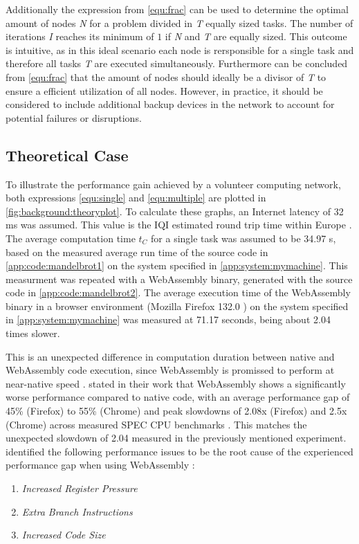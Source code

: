 Additionally the expression from \eqref{equ:frac} can be used to determine the optimal amount of nodes \emph{N} for a problem divided in \emph{T} equally sized tasks. The number of iterations \emph{I} reaches its minimum of $1$ if \emph{N} and \emph{T} are equally sized. This outcome is intuitive, as in this ideal scenario each node is rersponsible for a single task and therefore all tasks \emph{T} are executed simultaneously. Furthermore can be concluded from \eqref{equ:frac} that the amount of nodes should ideally be a divisor of \emph{T} to ensure a efficient utilization of all nodes. However, in practice, it should be considered to include additional backup devices in the network to account for potential failures or disruptions.

\subsection{Theoretical Case}
To illustrate the performance gain achieved by a volunteer computing network, both expressions \eqref{equ:single} and \eqref{equ:multiple} are plotted in \autoref{fig:background:theoryplot}. To calculate these graphs, an Internet latency of 32 ms \cite{backend:latency} was assumed. This value is the \ac{IQI} estimated round trip time within Europe \cite{backend:latency}. The average computation time $t_{C}$ for a single task was assumed to be 34.97 s, based on the measured average run time of the source code in \autoref{app:code:mandelbrot1} on the system specified in \autoref{app:system:mymachine}. This measurment was repeated with a WebAssembly binary, generated with the source code in \autoref{app:code:mandelbrot2}. The average execution time of the WebAssembly binary in a browser environment (Mozilla Firefox 132.0 \cite{background:firefox}) on the system specified in \autoref{app:system:mymachine} was measured at 71.17 seconds, being about 2.04 times slower. 
\newline
\begin{addmargin}[25pt]{25pt}
  This is an unexpected difference in computation duration between native and WebAssembly code execution, since WebAssembly is promissed to perform at near-native speed \cite{methodology:wasm, methodology:wasmW3C}. \citeauthor{background:not-so-fast} stated in their work that WebAssembly shows a significantly worse performance compared to native code, with an average performance gap of 45\% (Firefox) to 55\% (Chrome) and peak slowdowns of 2.08x (Firefox) and 2.5x (Chrome) across measured SPEC CPU benchmarks \cite{background:not-so-fast}. This matches the unexpected slowdown of 2.04 measured in the previously mentioned experiment. \citeauthor{background:not-so-fast} identified the following performance issues to be the root cause of the experienced performance gap when using WebAssembly \cite{background:not-so-fast}:
  \begin{enumerate}
    \item \emph{Increased Register Pressure}
    \item \emph{Extra Branch Instructions}
    \item \emph{Increased Code Size}
  \end{enumerate}
\end{addmargin}
